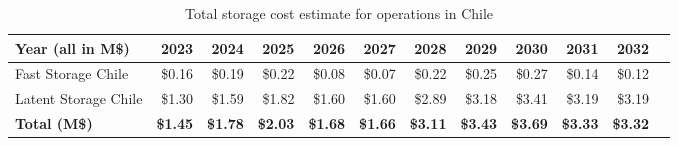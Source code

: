 \tiny \begin{longtable} { |p{}  |r  |r  |r  |r  |r  |r  |r  |r  |r  |r  |r |} 
\caption{Total storage cost estimate for operations in Chile \label{tab:opsStorageChile}}\\ 
\hline 
\textbf{Year (all in M\$)}&\textbf{2023}&\textbf{2024}&\textbf{2025}&\textbf{2026}&\textbf{2027}&\textbf{2028}&\textbf{2029}&\textbf{2030}&\textbf{2031}&\textbf{2032} \\ \hline
{Fast Storage Chile}&{\$0.16}&{\$0.19}&{\$0.22}&{\$0.08}&{\$0.07}&{\$0.22}&{\$0.25}&{\$0.27}&{\$0.14}&{\$0.12} \\ \hline
{Latent Storage Chile}&{\$1.30}&{\$1.59}&{\$1.82}&{\$1.60}&{\$1.60}&{\$2.89}&{\$3.18}&{\$3.41}&{\$3.19}&{\$3.19} \\ \hline
\textbf{Total (M\$)}&\textbf{\$1.45}&\textbf{\$1.78}&\textbf{\$2.03}&\textbf{\$1.68}&\textbf{\$1.66}&\textbf{\$3.11}&\textbf{\$3.43}&\textbf{\$3.69}&\textbf{\$3.33}&\textbf{\$3.32} \\ \hline
\end{longtable} \normalsize
